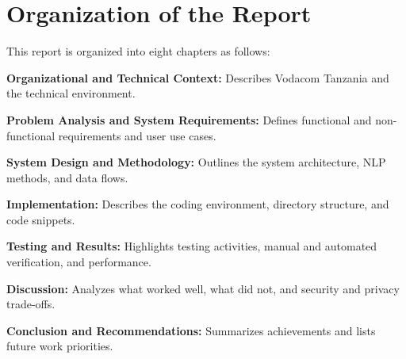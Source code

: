 \section{Organization of the Report}
This report is organized into eight chapters as follows:
\begin{description}[style=multiline,leftmargin=0pt,labelwidth=25mm]
  \item[\chapterref{ch:context}] \textbf{Organizational and Technical Context:} Describes Vodacom Tanzania and the technical environment.
  \item[\chapterref{ch:requirements}] \textbf{Problem Analysis and System Requirements:} Defines functional and non-functional requirements and user use cases.
  \item[\chapterref{ch:design}] \textbf{System Design and Methodology:} Outlines the system architecture, NLP methods, and data flows.
  \item[\chapterref{ch:implementation}] \textbf{Implementation:} Describes the coding environment, directory structure, and code snippets.
  \item[\chapterref{ch:testing}] \textbf{Testing and Results:} Highlights testing activities, manual and automated verification, and performance.
  \item[\chapterref{ch:discussion}] \textbf{Discussion:} Analyzes what worked well, what did not, and security and privacy trade-offs.
  \item[\chapterref{ch:conclusion}] \textbf{Conclusion and Recommendations:} Summarizes achievements and lists future work priorities.
\end{description}
